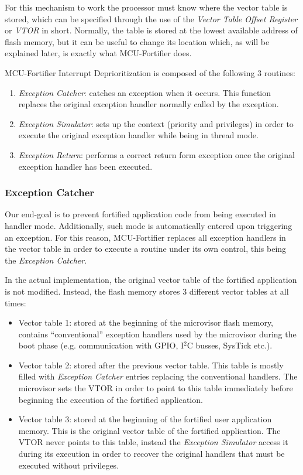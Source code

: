 \documentclass{article}
\begin{document}
For this mechanism to work the processor must know where the vector table is stored, which can be specified through the use of the \textit{Vector Table Offset Register} or \textit{VTOR} in short. Normally, the table is stored at the lowest available address of flash memory, but it can be useful to change its location which, as will be explained later, is exactly what MCU-Fortifier does.

MCU-Fortifier Interrupt Deprioritization is composed of the following 3 routines:
\begin{enumerate}
	\item \textit{Exception Catcher}: catches an exception when it occurs. This function replaces the original exception handler normally called by the exception.
	\item \textit{Exception Simulator}: sets up the context (priority and privileges) in order to execute the original exception handler while being in thread mode.
	\item \textit{Exception Return}: performs a correct return form exception once the original exception handler has been executed.
\end{enumerate}

\subsubsection{Exception Catcher}
Our end-goal is to prevent fortified application code from being executed in handler mode. Additionally, such mode is automatically entered upon triggering an exception. For this reason, MCU-Fortifier replaces all exception handlers in the vector table in order to execute a routine under its own control, this being the \textit{Exception Catcher}.

In the actual implementation, the original vector table of the fortified application is not modified. Instead, the flash memory stores 3 different vector tables at all times:
\begin{itemize}
	\item Vector table 1: stored at the beginning of the microvisor flash memory, contains ``conventional'' exception handlers used by the microvisor during the boot phase (e.g. communication with GPIO, I$^2$C busses, SysTick etc.).
	\item Vector table 2: stored after the previous vector table. This table is mostly filled with \textit{Exception Catcher} entries replacing the conventional handlers. The microvisor sets the VTOR in order to point to this table immediately before beginning the execution of the fortified application.
	\item Vector table 3: stored at the beginning of the fortified user application memory. This is the original vector table of the fortified application. The VTOR never points to this table, instead the \textit{Exception Simulator} access it during its execution in order to recover the original handlers that must be executed without privileges.
\end{itemize}
\end{document}
